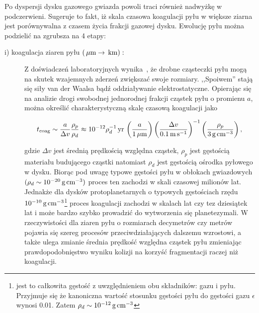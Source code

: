 \par Po dyspersji dysku gazowego gwiazda powoli traci również nadwyżkę w
podczerwieni. Sugeruje to fakt, iż skala czasowa koagulacji pyłu w większe
ziarna jest porównywalna z czasem życia frakcji gazowej dysku. Ewolucję pyłu
można podzielić na zgrubsza na 4 etapy:
\begin{description}
   \item[i) koagulacja ziaren pyłu $\left(\hbox{$\thinspace\mu\textrm{m}$} \rightarrow \hbox{$\thinspace\textrm{km}$}\right):$] 
      Z doświadczeń laboratoryjnych wynika~\cite{me}, że drob\-ne cząsteczki pyłu
      mogą na skutek wzajemnych zderzeń zwiększać swoje rozmiary. ,,Spoiwem'' stają
      się siły van der Waalsa bądź oddziaływanie elektrostatyczne. Opierając się
      na analizie drogi swobodnej jednorodnej frakcji cząstek pyłu o promienu
      $a$, można określić charakterystyczną skalę czasową koagulacji jako 

   \begin{equation}\label{coag} 
      t_{\textrm{coag}} %
      \sim \frac{a}{\Delta v}\frac{\rho_p}{\rho_d} \approx 
      10^{-12} \rho_d^{-1}\yr\thinspace
      \left(\frac{a}{1\mum}\right)
      \left(\frac{\Delta v}{0.1\m\s^{-1}}\right)^{-1}
      \left(\frac{\rho_p}{3\g\cm^{-3}}\right),
   \end{equation}

   gdzie $\Delta v$ jest średnią prędkością względna cząstek, $\rho_p$ jest
   gęstością materiału budującego cząstki natomiast $\rho_d$ jest gęstością
   ośrodka pyłowego w dysku.  Biorąc pod uwagę typowe gęstości pyłu w obłokach
   gwiazdowych $(\rho_d \sim 10^{-20}\hbox{$\thinspace\textrm{g}$}\hbox{$\thinspace\textrm{cm}$}^{-3})$ proces ten
   zachodzi w skali czasowej milionów lat. Jednakże dla dysków protoplanetarnych
   o typowych gęstościach rzędu $10^{-10}\hbox{$\thinspace\textrm{g}$}\hbox{$\thinspace\textrm{cm}$}^{-3}$\footnote{jest to całkowita
   gęstość z uwzględnieniem obu składników: gazu i pyłu. Przyjmuje się że
kanoniczna wartość stosunku gęstości pyłu do gęstości gazu $\epsilon$ wynosi
0.01. Zatem $\rho_d \sim 10^{-12}\hbox{$\thinspace\textrm{g}$}\hbox{$\thinspace\textrm{cm}$}^{-3}$} proces
koagulacji zachodzi w skalach lat czy tez dziesiątek lat i może bardzo szybko
prowadzić do wytworzenia się planetezymali. W rzeczywistości dla ziaren pyłu o
rozmiarach decymetrów czy metrów pojawia się szereg procesów przeciwdziałających
dalszemu wzrostowi, a także ulega zmianie średnia prędkość względna cząstek pyłu
zmieniając prawdopodobnięstwo wyniku kolizji na korzyść fragmentacji raczej niż
koagulacji.  


\end{description}
